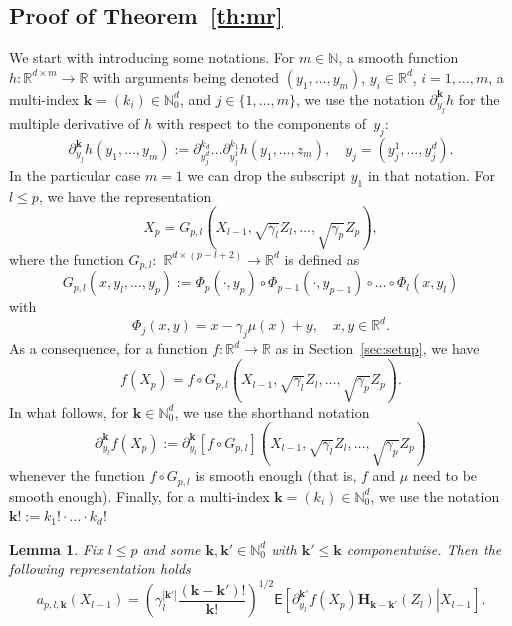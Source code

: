\documentclass[bj]{imsart}
\newtheorem{lem}[thm]{Lemma}
\begin{document}
\subsection{Proof of Theorem~\ref{th:mr}}
We start with introducing some notations.
For $m\in\mathbb N$, a smooth function
$h\colon\mathbb R^{d\times m}\to\mathbb R$
with arguments being denoted
$(y_1,\ldots,y_m)$, $y_i\in\mathbb R^d$, $i=1,\ldots,m$,
a multi-index $\mathbf k=(k_i)\in\mathbb N_0^d$,
and $j\in\{1,\ldots,m\}$,
we use the notation $\partial^{\mathbf k}_{y_j} h$ for the multiple derivative of $h$
with respect to the components of~$y_j$:
$$
\partial^{\mathbf k}_{y_j} h(y_1,\ldots,y_m)
:=\partial^{k_d}_{y_j^d}
\ldots
\partial^{k_1}_{y_j^1}
h(y_1,\ldots,z_m),
\quad y_j=(y_j^1,\ldots,y_j^d).
$$
In the particular case $m=1$ we can drop
the subscript $y_1$ in that notation.
For $l\le p$, we have the representation
\[
X_{p}=G_{p,l}(X_{l-1},\sqrt{\gamma_{l}}Z_{l},\ldots,\sqrt{\gamma_{p}}Z_{p}),
\]
where the function \(G_{p,l}:\) \(\mathbb{R}^{d\times(p-l+2)}\to \mathbb{R}^{d}\) is defined as
\begin{equation}
\label{eq:definition-G-p-l}
G_{p,l}(x,y_l,\ldots,y_p):=\Phi_{p}(\cdot,y_{p})\circ\Phi_{p-1}(\cdot,y_{p-1})\circ\ldots\circ\Phi_{l}(x,y_{l})
\end{equation}
with
\[
\Phi_{j}(x,y)=x-\gamma_{j}\mu(x)+y,
\quad x,y\in\mathbb R^d.
\]
As a consequence,
for a function $f\colon\mathbb R^d\to\mathbb R$
as in Section~\ref{sec:setup}, we have
$$
f\left(X_{p}\right) =f\circ G_{p,l}(X_{l-1},\sqrt{\gamma_{l}}Z_{l},\ldots,\sqrt{\gamma_{p}}Z_{p}).
$$
In what follows, for $\mathbf{k}\in\mathbb N_0^d$,
we use the shorthand notation
\begin{equation}
\label{eq:definition-differential-f-p}
\partial_{y_l}^{\mathbf k} f\left(X_{p}\right)
:=\partial_{y_l}^{\mathbf k} [f\circ G_{p,l}](X_{l-1},\sqrt{\gamma_{l}}Z_{l},\ldots,\sqrt{\gamma_{p}}Z_{p})
\end{equation}
whenever the function $f\circ G_{p,l}$ is smooth enough
(that is, $f$ and $\mu$ need to be smooth enough).
Finally, for a multi-index $\mathbf{k}=(k_i)\in\mathbb N_0^d$, we use the notation
\(\mathbf{k} ! :=k_1!\cdot\ldots\cdot k_d !\)

\begin{lem}\label{eq:a_repr}
Fix $l\le p$ and some \(\mathbf{k},\mathbf{k}'\in \mathbb{N}_0^d\) with \(\mathbf{k}'\le \mathbf{k}\) componentwise.  Then the following representation holds
$$
a_{p,l,\mathbf{k}}(X_{l-1})=\left(\gamma_{l}^{|\mathbf{k}'|}\frac{(\mathbf{k}-\mathbf{k}') !}{\mathbf{k}!}\right)^{1/2}
\mathsf E\left[\left.
\partial_{y_l}^{\mathbf{k}'}f(X_p)\mathbf{H}_{\mathbf{k}-\mathbf{k}'}(Z_l)\right|X_{l-1}\right].
$$
\end{lem}
\end{document}
